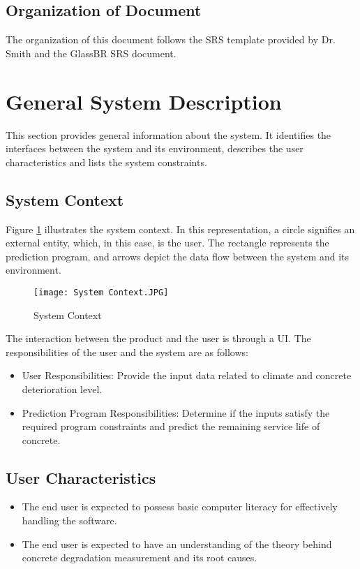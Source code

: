 \documentclass[12pt]{article}
\begin{document}
\subsection{Organization of Document}

The organization of this document follows the SRS template provided by Dr. Smith and the GlassBR SRS document\cite{glassbr_spec}.

\section{General System Description}

This section provides general information about the system.  It identifies the interfaces between the system and its environment, describes the user characteristics and lists the system constraints.  

\subsection{System Context}
{Figure \ref{fig:syscon}} illustrates the system context. In this representation, a circle signifies an external entity, which, in this case, is the user. The rectangle represents the prediction program, and arrows depict the data flow between the system and its environment.

\begin{figure}
    \centering
    \texttt{[image: System Context.JPG]}
    \caption{System Context}
    \label{fig:syscon}
\end{figure}

The interaction between the product and the user is through a UI. The responsibilities of the user and the system are as follows: 

\begin{itemize}
\item User Responsibilities: Provide the input data related to climate and concrete deterioration level.
\end{itemize}
\begin{itemize}
\item Prediction Program Responsibilities: Determine if the inputs satisfy the required program constraints and predict the remaining service life of concrete.
\end{itemize}

\subsection{User Characteristics} \label{SecUserCharacteristics}
\begin{itemize}
\item The end user is expected to possess basic computer literacy for effectively handling the software.
\item The end user is expected to have an understanding of the theory behind concrete degradation measurement and its root causes.
\end{itemize}
\end{document}
